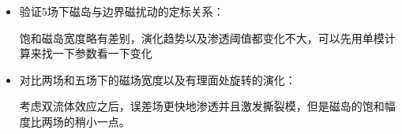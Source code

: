 \documentclass[11pt,a4paper]{article}
\begin{document}
\begin{itemize}
	\item 验证5场下磁岛与边界磁扰动的定标关系：
		\begin{figure}[H]
		\centering
		\caption{}		
		\end{figure}
	饱和磁岛宽度略有差别，演化趋势以及渗透阈值都变化不大，可以先用单模计算来找一下参数看一下变化
	
	\item 对比两场和五场下的磁场宽度以及有理面处旋转的演化：
	\begin{figure}[H]
		\centering
		\caption{}		
	\end{figure}
	考虑双流体效应之后，误差场更快地渗透并且激发撕裂模，但是磁岛的饱和幅度比两场的稍小一点。
	

\end{itemize}
\end{document}
